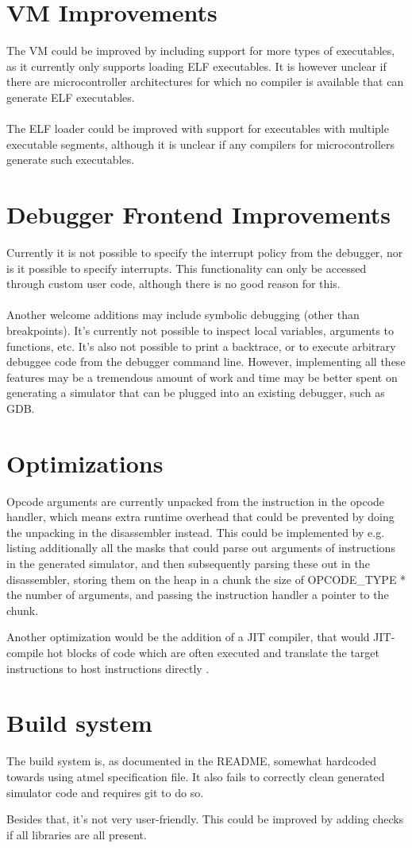 \section{VM Improvements}
The VM could be improved by including support for more types of executables, as
it currently only supports loading ELF executables. It is however unclear if there are
microcontroller architectures for which no compiler is available that can
generate ELF executables.\\
\\
The ELF loader could be improved with support for executables with multiple 
executable segments, although it is unclear if any compilers for microcontrollers
generate such executables.

\section{Debugger Frontend Improvements}
Currently it is not possible to specify the interrupt policy from the
debugger, nor is it possible to specify interrupts. This functionality can
only be accessed through custom user code, although there is no good reason
for this.\\
\\
Another welcome additions may include symbolic debugging (other than
breakpoints). It's currently not possible to inspect local variables,
arguments to functions, etc. It's also not possible to print a backtrace, or
to execute arbitrary debuggee code from the debugger command line. 
However, implementing all these
features may be a tremendous amount of work and time may be better spent on
generating a simulator that can be plugged into an existing debugger, such as
GDB.

\section{Optimizations}
Opcode arguments are currently unpacked from the instruction in the opcode
handler, which means extra runtime overhead that could be prevented by doing
the unpacking in the disassembler instead. This could be implemented by e.g.
listing additionally all the masks that could parse out arguments of
instructions in the generated simulator, and then subsequently parsing these
out in the disassembler, storing them on the heap in a chunk the size of
OPCODE\_TYPE * the number of arguments, and passing the instruction handler a
pointer to the chunk.

Another optimization would be the addition of a JIT compiler, that would
JIT-compile hot blocks of code which are often executed and translate the
target instructions to host instructions directly \cite{JIT}.

\section{Build system}
The build system is, as documented in the README, somewhat hardcoded towards
using atmel specification file. It also fails to correctly clean generated
simulator code and requires git to do so.

Besides that, it's not very user-friendly. This could be improved by adding
checks if all libraries are all present.

